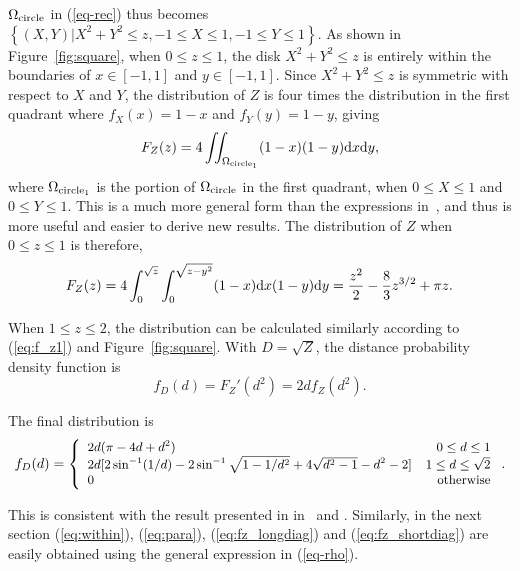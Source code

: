 \documentclass[12pt,draftclsnofoot,onecolumn]{IEEEtran}
\begin{document}
$\Omega_{\rm circle}$ in (\ref{eq-rec}) thus becomes $\left\{(X,Y)|X^2+Y^2\leq z, -1 
\leq X \leq 1, -1 \leq Y \leq 1\right\}$. As shown in Figure~\ref{fig:square}, when
$0\leq z\leq1$, the disk $X^2+Y^2\leq z$ is entirely within the boundaries 
of $x \in {[-1,1]}$ and $y \in {[-1,1]}$. 
Since $X^2+Y^2\leq z$ is symmetric with respect to $X$ and $Y$, the
distribution of $Z$ is four times the distribution in the first quadrant where
$f_X(x)=1-x$ and $f_Y(y)=1-y$, giving
\begin{equation}\label{eq:f_z1}
F_Z(z)=4\iint_{\Omega_{\rm circle_1}}(1-x)(1-y){\rm d}x{\rm d}y, 
\end{equation}
where $\Omega_{\rm circle_1}$ is the portion of $\Omega_{\rm circle}$ in 
the first quadrant, when $0 \leq X \leq 1$ and $0 \leq Y \leq 1$. 
This is a much more general form than the expressions in~\cite{zhuang2011random,
zhuang2012geometrical}, and thus is more useful and easier to derive new results.
The distribution of $Z$ when $0\leq z\leq1$ is therefore, 
\begin{equation}
F_Z(z)=4\int_0^{\sqrt{z}}\int_0^{\sqrt{z-y^2}}(1-x){\rm d}x(1-y){\rm d}y 
=\frac{z^2}{2}-\frac{8}{3}z^{3/2}+\pi z. \nonumber
\end{equation}

When $1\leq z\leq 2$, the distribution can be calculated similarly according to 
(\ref{eq:f_z1}) and Figure~\ref{fig:square}. 
With $D=\sqrt{Z}$, the distance probability density function is
\begin{equation}\label{eq:fd-fz}
f_D(d)=F_Z'(d^2)=2df_Z(d^2).
\end{equation}

The final distribution is 
\begin{equation}\small
  f_{D}(d)=\left\{
    \begin{array}{lr}
      2d(\pi-4d+d^2) & 0\leq d\leq 1\\
      2d[2\sin^{-1}(1/d)-2\sin^{-1}\sqrt{1-1/d^2}+4\sqrt{d^2-1}-d^2-2] & 1\leq d\leq \sqrt{2} \\
      0 & {\rm otherwise}
    \end{array}
  \right..
\end{equation}

This is consistent with the result presented in in~\cite{ghosh1943distribution} and 
\cite{ghosh1943random}.
Similarly, in the next section (\ref{eq:within}), (\ref{eq:para}), (\ref{eq:fz_longdiag}) and
(\ref{eq:fz_shortdiag}) are easily obtained using the general expression in (\ref{eq-rho}).
\end{document}
